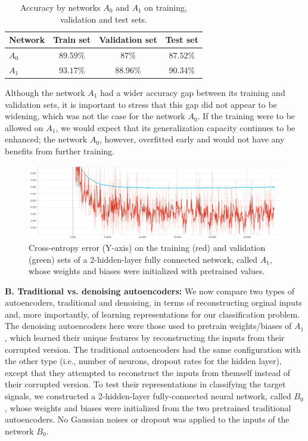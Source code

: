 \documentclass[12pt]{article}
\begin{document}
\begin{table}
\begin{center}
\begin{tabular}{|l||c|c|c|}
\hline
Network & Train set & Validation set & Test set \\ \hline \hline
$A_0$ & $89.59\%$ & $87\%$ & $87.52\%$ \\ \hline
$A_1$ & $93.17\%$ & $88.96\%$ & $90.34\%$ \\ \hline
\end{tabular}
\caption{Accuracy by networks $A_0$ and $A_1$ on training, validation and test sets.}
\label{tab:Accuracy_A0_vs_A1}
\end{center}
\end{table}

Although the network $A_1$ had a wider accuracy gap between its training and validation sets, it is important to stress that this gap did not appear to be widening, which was not the case for the network $A_0$. If the training were to be allowed on $A_1$, we would expect that its generalization capacity continues to be enhanced; the network $A_0$, however, overfitted early and would not have any benefits from further training.

\begin{figure}
  \includegraphics[width=\linewidth]{figures/stack_50_50_dropout_elu/learning_curves.eps}
  \caption{Cross-entropy error (Y-axis) on the training (red) and validation (green) sets of a 2-hidden-layer fully connected network, called $A_1$, whose weights and biases were initialized with pretrained values.}
  \label{fig:stack_50_50_dropout_elu_learning_curves}
\end{figure}

\vspace{5mm}
\noindent
\textbf{B. Traditional vs. denoising autoencoders:}
\noindent
We now compare two types of autoencoders, traditional and denoising, in terms of reconstructing orginal inputs and, more importantly, of learning representations for our classification problem. The denoising autoencoders here were those used to pretrain weights/biases of $A_1$, which learned their unique features by reconstructing the inputs from their corrupted version. The traditional autoencoders had the same configuration with the other type (i.e., number of neurons, dropout rates for the hidden layer), except that they attempted to reconstruct the inputs from themself instead of their corrupted version. To test their representations in classifying the target signals, we constructed a 2-hidden-layer fully-connected neural network, called $B_0$, whose weights and biases were initialized from the two pretrained traditional autoencoders. No Gaussian noises or dropout was applied to the inputs of the network $B_0$.
\end{document}

